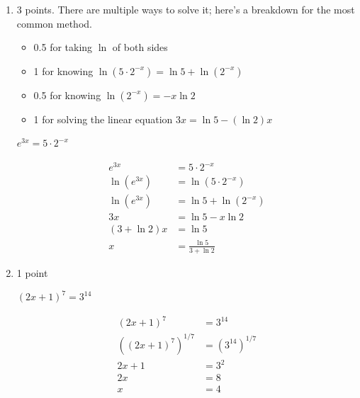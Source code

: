 \documentclass{article}
\begin{document}
\begin{enumerate}
\begin{enumerate}
  \item

    \begin{grading}
      3 points. There are multiple ways to solve it; here's a breakdown for the most common method.
      \begin{itemize}[nosep]
      \item 0.5 for taking $\ln$ of both sides
      \item 1 for knowing $\ln \left( 5 \cdot 2^{-x} \right) = \ln 5 + \ln \left( 2^{-x} \right)$
      \item 0.5 for knowing $\ln \left( 2^{-x} \right) = -x \ln 2$
      \item 1 for solving the linear equation $3x = \ln 5 - (\ln 2) x$
      \end{itemize}
    \end{grading}

    \begin{problem}[\stretch{1.5}]
      $e^{3x} = 5 \cdot 2^{-x}$
    \end{problem}

    \begin{align*}
      e^{3x} &= 5\cdot 2^{-x} \\
      \ln (e^{3x}) &= \ln(5\cdot 2^{-x}) \\
      \ln (e^{3x}) &= \ln 5 + \ln(2^{-x}) \\
      3x &= \ln 5 - x\ln 2 \\
      (3+\ln2)x &= \ln 5 \\
      x &= \boxed{\frac{\ln5}{3+\ln2}}
    \end{align*}

  \item

    \begin{grading}
      1 point      
    \end{grading}

    \begin{problem}[\vfill\newpage]
      $(2x + 1)^7 = 3^{14}$
    \end{problem}

    \begin{solution}
      \begin{align*}
        (2x+1)^7 &= 3^{14} \\
        ((2x+1)^7)^{1/7} &= (3^{14})^{1/7} \\
        2x+1 &= 3^2 \\
        2x &= 8 \\
        x &= \boxed{4}
      \end{align*}
    \end{solution}


\end{enumerate}
\end{enumerate}
\end{document}
